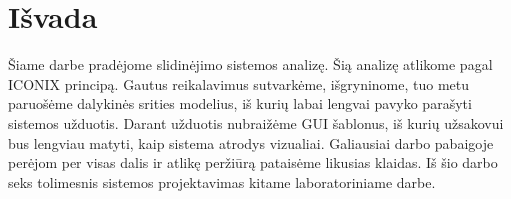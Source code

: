 \documentclass[oneside]{VUMIFPSkursinis}
\begin{document}
\section{Išvada}
Šiame darbe pradėjome slidinėjimo sistemos analizę. Šią analizę atlikome pagal ICONIX principą. Gautus reikalavimus sutvarkėme, išgryninome, tuo metu paruošėme dalykinės srities modelius, iš kurių labai lengvai pavyko parašyti sistemos užduotis. Darant užduotis nubraižėme GUI šablonus, iš kurių užsakovui bus lengviau matyti, kaip sistema atrodys vizualiai. Galiausiai darbo pabaigoje perėjom per visas dalis ir atlikę peržiūrą pataisėme likusias klaidas. Iš šio darbo seks tolimesnis sistemos projektavimas kitame laboratoriniame darbe.
\end{document}
